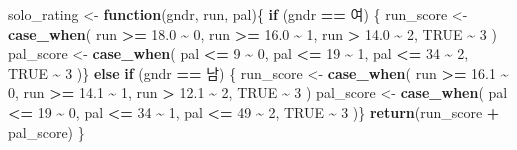 \documentclass[
]{article}
\newenvironment{Shaded}{\begin{snugshade}}{\end{snugshade}}
\newcommand{\ConstantTok}[1]{\textcolor[rgb]{0.56,0.35,0.01}{#1}}
\newcommand{\ControlFlowTok}[1]{\textcolor[rgb]{0.13,0.29,0.53}{\textbf{#1}}}
\newcommand{\DecValTok}[1]{\textcolor[rgb]{0.00,0.00,0.81}{#1}}
\newcommand{\FloatTok}[1]{\textcolor[rgb]{0.00,0.00,0.81}{#1}}
\newcommand{\FunctionTok}[1]{\textcolor[rgb]{0.13,0.29,0.53}{\textbf{#1}}}
\newcommand{\NormalTok}[1]{#1}
\newcommand{\OtherTok}[1]{\textcolor[rgb]{0.56,0.35,0.01}{#1}}
\newcommand{\SpecialCharTok}[1]{\textcolor[rgb]{0.81,0.36,0.00}{\textbf{#1}}}
\newcommand{\StringTok}[1]{\textcolor[rgb]{0.31,0.60,0.02}{#1}}
\begin{document}
\begin{Shaded}
\begin{Highlighting}[]
\NormalTok{solo\_rating }\OtherTok{\textless{}{-}} \ControlFlowTok{function}\NormalTok{(gndr, run, pal)\{}
  \ControlFlowTok{if}\NormalTok{ (gndr }\SpecialCharTok{==} \StringTok{\textquotesingle{}여\textquotesingle{}}\NormalTok{) \{}
\NormalTok{    run\_score }\OtherTok{\textless{}{-}} \FunctionTok{case\_when}\NormalTok{(}
\NormalTok{    run }\SpecialCharTok{\textgreater{}=} \FloatTok{18.0} \SpecialCharTok{\textasciitilde{}} \DecValTok{0}\NormalTok{,}
\NormalTok{    run }\SpecialCharTok{\textgreater{}=} \FloatTok{16.0} \SpecialCharTok{\textasciitilde{}} \DecValTok{1}\NormalTok{,}
\NormalTok{    run }\SpecialCharTok{\textgreater{}} \FloatTok{14.0} \SpecialCharTok{\textasciitilde{}} \DecValTok{2}\NormalTok{,}
    \ConstantTok{TRUE} \SpecialCharTok{\textasciitilde{}} \DecValTok{3}
\NormalTok{    )}
\NormalTok{    pal\_score }\OtherTok{\textless{}{-}} \FunctionTok{case\_when}\NormalTok{(}
\NormalTok{    pal }\SpecialCharTok{\textless{}=} \DecValTok{9} \SpecialCharTok{\textasciitilde{}} \DecValTok{0}\NormalTok{,}
\NormalTok{    pal }\SpecialCharTok{\textless{}=} \DecValTok{19} \SpecialCharTok{\textasciitilde{}} \DecValTok{1}\NormalTok{,}
\NormalTok{    pal }\SpecialCharTok{\textless{}=} \DecValTok{34} \SpecialCharTok{\textasciitilde{}} \DecValTok{2}\NormalTok{,}
    \ConstantTok{TRUE} \SpecialCharTok{\textasciitilde{}} \DecValTok{3}
\NormalTok{    )\} }
    \ControlFlowTok{else} \ControlFlowTok{if}\NormalTok{ (gndr }\SpecialCharTok{==} \StringTok{\textquotesingle{}남\textquotesingle{}}\NormalTok{) \{}
\NormalTok{    run\_score }\OtherTok{\textless{}{-}} \FunctionTok{case\_when}\NormalTok{(}
\NormalTok{    run }\SpecialCharTok{\textgreater{}=} \FloatTok{16.1} \SpecialCharTok{\textasciitilde{}} \DecValTok{0}\NormalTok{,}
\NormalTok{    run }\SpecialCharTok{\textgreater{}=} \FloatTok{14.1} \SpecialCharTok{\textasciitilde{}} \DecValTok{1}\NormalTok{,}
\NormalTok{    run }\SpecialCharTok{\textgreater{}} \FloatTok{12.1} \SpecialCharTok{\textasciitilde{}} \DecValTok{2}\NormalTok{,}
    \ConstantTok{TRUE} \SpecialCharTok{\textasciitilde{}} \DecValTok{3}
\NormalTok{    )}
\NormalTok{    pal\_score }\OtherTok{\textless{}{-}} \FunctionTok{case\_when}\NormalTok{(}
\NormalTok{    pal }\SpecialCharTok{\textless{}=} \DecValTok{19} \SpecialCharTok{\textasciitilde{}} \DecValTok{0}\NormalTok{,}
\NormalTok{    pal }\SpecialCharTok{\textless{}=} \DecValTok{34} \SpecialCharTok{\textasciitilde{}} \DecValTok{1}\NormalTok{,}
\NormalTok{    pal }\SpecialCharTok{\textless{}=} \DecValTok{49} \SpecialCharTok{\textasciitilde{}} \DecValTok{2}\NormalTok{,}
    \ConstantTok{TRUE} \SpecialCharTok{\textasciitilde{}} \DecValTok{3}
\NormalTok{    )\}}
  \FunctionTok{return}\NormalTok{(run\_score }\SpecialCharTok{+}\NormalTok{ pal\_score)}
\NormalTok{\}}


\end{Highlighting}
\end{Shaded}
\end{document}
